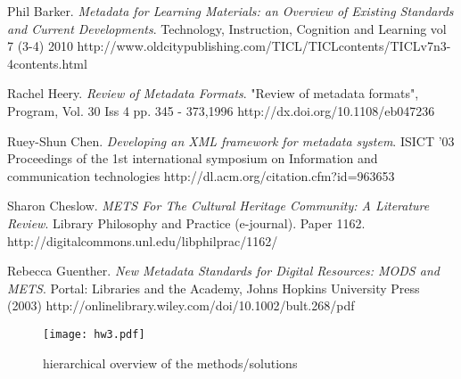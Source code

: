 \documentclass[a4paper]{article} %
\begin{document}
\begin{thebibliography}{99}
Phil Barker.
\newblock \emph{Metadata for Learning Materials: an Overview of Existing Standards and Current Developments}.
\newblock Technology, Instruction, Cognition and Learning vol 7 (3-4) 2010
\newblock http://www.oldcitypublishing.com/TICL/TICLcontents/TICLv7n3-4contents.html


Rachel Heery.
\newblock \emph{Review of Metadata Formats}.
\newblock "Review of metadata formats", Program, Vol. 30 Iss 4 pp. 345 - 373,1996
\newblock http://dx.doi.org/10.1108/eb047236

Ruey-Shun Chen.
\newblock \emph{Developing an XML framework for metadata system}.
\newblock ISICT '03 Proceedings of the 1st international symposium on Information and communication technologies
\newblock http://dl.acm.org/citation.cfm?id=963653

Sharon Cheslow.
\newblock \emph{METS For The Cultural Heritage Community: A	Literature Review}.
\newblock Library Philosophy and Practice (e-journal). Paper 1162.
\newblock http://digitalcommons.unl.edu/libphilprac/1162/

Rebecca Guenther.
\newblock \emph{New Metadata Standards for Digital Resources: MODS and METS}.
\newblock Portal: Libraries and the Academy, Johns Hopkins University Press (2003)
\newblock http://onlinelibrary.wiley.com/doi/10.1002/bult.268/pdf

\end{thebibliography}


\clearpage %

\begin{figure*}[p] %
	\begin{center}
		\texttt{[image: hw3.pdf]}
	\end{center}
	\caption{hierarchical overview of the methods/solutions}
	\label{fig:hw3}
\end{figure*}
\end{document}
